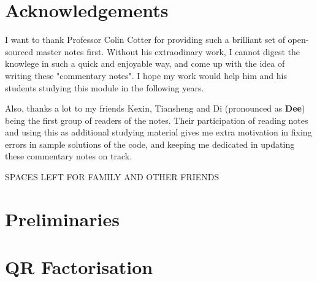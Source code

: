 \documentclass[a4paper,12pt,twoside]{report}
\begin{document}
\chapter*{Acknowledgements}
I want to thank Professor Colin Cotter for providing such a brilliant set of open-sourced master notes first.
Without his extraodinary work, I cannot digest the knowlege in such a quick and enjoyable way, and come up with the idea of writing these "commentary notes". 
I hope my work would help him and his students studying this module in the following years.

\medskip
\noindent Also, thanks a lot to my friends Kexin, Tiansheng and Di (pronounced as \textbf{Dee}) being the first group of readers of the notes. Their participation of reading notes and using this as additional studying material gives me extra motivation in fixing errors in sample solutions of the code, and keeping me dedicated in updating these commentary notes on track.

\medskip
\noindent SPACES LEFT FOR FAMILY AND OTHER FRIENDS
\tableofcontents
\listoffigures

\chapter{Preliminaries}


\chapter{QR Factorisation}


% 

% 

% 

% 
\end{document}
